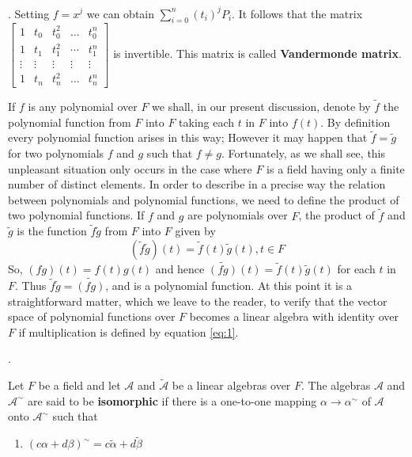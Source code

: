 \documentclass[8pt]{beamer}
\newcommand{\mc}[1]{\mathcal{#1}}
\newcommand{\tb}[1]{\textbf{#1}}
\begin{document}
\begin{frame}{.}
    Setting $f=x^j$ we can obtain $\sum_{i=0}^n (t_i)^j P_i$.
    It follows that the matrix $\begin{bmatrix}
    1 & t_0 & t_0^2 & \dots & t_0^n \\  1 & t_1 & t_1^2 & \cdots & t_1^n \\ \vdots & \vdots &\vdots & \vdots & \vdots \\ 1 & t_n & t_n^2 & \dots & t_n^n
    \end{bmatrix}$ is invertible.
    This matrix is called \tb{Vandermonde matrix}.

    \bigskip
    If $f$ is any polynomial over $F$ we shall, in our present discussion, denote by $\tilde{f}$ the polynomial function from $F$ into $F$ taking each $t$ in $F$ into $f(t)$.
    By definition every polynomial function arises in this way;
    However it may happen that $\tilde{f} = \tilde{g}$ for two polynomials $f$ and $g$ such that $f \neq g$.
    Fortunately, as we shall see, this unpleasant situation only occurs in the case where $F$ is a field having only a finite number of distinct elements.
    In order to describe in a precise way the relation between polynomials and polynomial functions, we need to define the product of two polynomial functions.
    If $f$ and $g$ are polynomials over $F$, the product of $\tilde{f}$ and $\tilde{g}$ is the function $\tilde{f}\tilde{g}$ from $F$ into $F$ given by 
    \begin{equation}
    \label{eq:1}
        (\tilde{f}\tilde{g})(t) = \tilde{f}(t) \tilde{g}(t), t \in F
    \end{equation}
    So, $(fg)(t) = f(t)g(t)$ and hence $\tilde{(fg)}(t) = \tilde{f}(t) \tilde{g}(t)$ for each $t$ in $F$.
    Thus $\tilde{f}\tilde{g} = \tilde{(fg)}$, and is a polynomial function.
    At this point it is a straightforward matter, which we leave to the reader, to verify that the vector space of polynomial functions over $F$ becomes a linear algebra with identity over $F$ if multiplication is defined by equation \ref{eq:1}.
\end{frame}

\begin{frame}{.}
    \begin{definition}
        Let $F$ be a field and let $\mc{A}$ and $\tilde{\mc{A}}$ be a linear algebras over $F$.
        The algebras $\mc{A}$ and $\mc{A}^\sim$ are said to be \tb{isomorphic} if there is a one-to-one mapping $\alpha \to \alpha^\sim$ of $\mc{A}$ onto $\mc{A}^\sim$ such that
        \begin{enumerate}
            \item ${(c\alpha + d \beta)}^\sim = c \tilde{\alpha} + d \tilde{\beta}$
        \end{enumerate}
    \end{definition}
\end{frame}
\end{document}
